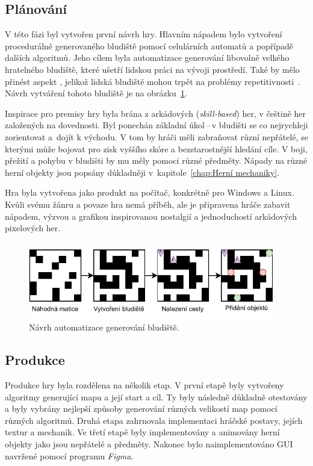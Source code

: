 \subsection*{Plánování}
V této fázi byl vytvořen první návrh hry. Hlavním nápadem bylo vytvoření procedurálně generovaného bludiště pomocí celulárních automatů a popřípadě dalších algoritmů. Jeho cílem byla automatizace generování libovolně velkého hratelného bludiště, které ušetří lidskou práci na vývoji prostředí. Také by mělo přinést aspekt , jelikož lidská bludiště mohou trpět na problémy repetitivnosti~\cite{Procedural_Game_Map}. Návrh vytváření tohoto bludiště je na obrázku~\ref{fig:navrh_generovani}.

Inspirace pro premisy hry byla brána z arkádových (\textit{skill-based}) her, v češtině her založených na dovednosti. Byl ponechán základní úkol\,--\,v bludišti se co nejrychleji zorientovat a~dojít k východu. V tom by hráči měli zabraňovat různí nepřátelé, se kterými může bojovat pro zisk vyššího skóre a bezstarostnější hledání cíle. V boji, přežití a pohybu v bludišti by mu měly pomoci různé předměty. Nápady na různé herní objekty jsou popsány důkladněji v~kapitole~\ref{chap:Herní mechaniky}.

Hra byla vytvořena jako produkt na počítač, konkrétně pro Windows a Linux. Kvůli svému žánru a povaze hra nemá příběh, ale je připravena hráče zabavit nápadem, výzvou a grafikou inspirovanou nostalgií a jednoduchostí arkádových pixelových her.

\begin{figure}[t]
    \centering
    \includegraphics[width=0.96\textwidth]{obrazky-figures/ch3/navrh_generovani.pdf}
    \caption{Návrh automatizace generování bludiště.}
    \label{fig:navrh_generovani}
\end{figure}

\subsection*{Produkce}
Produkce hry byla rozdělena na několik etap. V první etapě byly vytvořeny algoritmy generující mapu a její start a cíl. Ty byly následně důkladně otestovány a byly vybrány nejlepší způsoby generování různých velikostí map pomocí různých algoritmů. Druhá etapa zahrnovala implementaci hráčské postavy, jejích textur a mechanik. Ve třetí etapě byly implementovány a animovány herní objekty jako jsou nepřátelé a předměty. Nakonec bylo naimplementováno GUI navržené pomocí programu \textit{Figma}.

